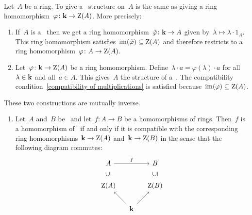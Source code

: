 \begin{remark}
  \label{characterization of algebras}
  Let~$A$ be a ring.
  To give a~{\kalg} structure on~$A$ is the same as giving a ring homomorphism~$\varphi \colon \mathbf{k} \to \operatorname{Z}(A)$.
  More precisely:
  \begin{enumerate}
    \item
      If~$A$ is a~{\kalg} then we get a ring homomorphism~$\tilde{\varphi} \colon \mathbf{k} \to A$ given by~$\lambda \mapsto \lambda \cdot 1_A$.
      This ring homomorphism satisfies~$\operatorname{im}(\tilde{\varphi}) \subseteq \operatorname{Z}(A)$ and therefore restricts to a ring homomorphism~$\varphi \colon A \to \operatorname{Z}(A)$.
    \item
      Let~$\varphi \colon \mathbf{k} \to \operatorname{Z}(A)$ be a ring homomorphism.
      Define~$\lambda \cdot a = \varphi(\lambda) \cdot a$ for all~$\lambda \in \mathbf{k}$ and all~$a \in A$.
      This gives~$A$ the structure of a~{\module{$\kf$}}.
      The compatibility condition~\eqref{compatibility of multiplications} is satisfied because~$\operatorname{im}(\varphi) \subseteq \operatorname{Z}(A)$.
  \end{enumerate}
  These two constructions are mutually inverse.
  \begin{enumerate}[resume]
    \item
      Let~$A$ and~$B$ be~{\kalgs} and let~$f \colon A \to B$ be a homomorphisms of rings.
      Then~$f$ is a homomorphism of~{\kalgs} if and only if it is compatible with the corresponding ring homomorphisms~$\mathbf{k} \to \operatorname{Z}(A)$ and~$\mathbf{k} \to \operatorname{Z}(B)$ in the sense that the following diagram commutes:
      \[
        \begin{tikzcd}[column sep = small]
            A
            \arrow{rr}[above]{f}
          & {}
          & B
          \\
            \ringcenter(A)
            \arrow[phantom]{u}[description, rotate=90]{\subseteq}
          & {}
          & \ringcenter(B)
            \arrow[phantom]{u}[description, rotate=90]{\subseteq}
          \\
            {}
          & \kf
            \arrow{ul}
            \arrow{ur}
          & {}
        \end{tikzcd}
      \]
  \end{enumerate}
\end{remark}


